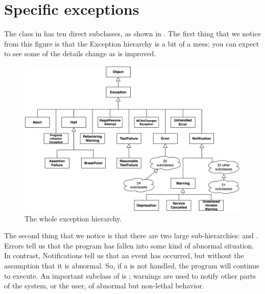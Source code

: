 \documentclass[a4paper,10pt,twoside]{book}
\begin{document}
\section{Specific exceptions}

The class  in \pharo{} has ten direct subclasses, as shown in .
The first thing that we notice from this figure is that the Exception hierarchy is a bit of a mess; you can expect to see some of the details change as \pharo{} is improved.

\begin{figure}[ht]\centering
        \includegraphics[width=.95\linewidth]{ExceptionSubclasses}
        \caption{The whole \pharo exception hierarchy.}
\end{figure}

The second thing that we notice is that there are two large sub-hierarchies:  and . 
Errors tell us that the program has fallen into some kind of abnormal situation. 
In contrast, Notifications tell us that an event has occurred, but without the assumption that it is abnormal. 
So, if a  is not handled, the program will continue to execute. 
An important subclass of  is ;  warnings are used to notify other parts of the system, or the user, of abnormal but non-lethal behavior.
%
\end{document}
